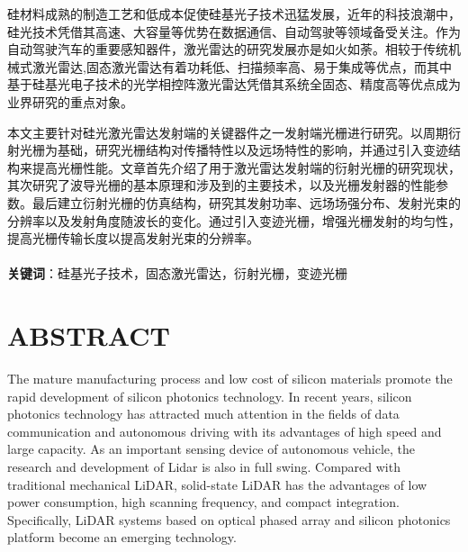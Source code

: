 \documentclass[UTF8,a4paper,12pt]{ctexart}
\numberwithin{equation}{section}
\begin{document}
\hspace{8mm}
硅材料成熟的制造工艺和低成本促使硅基光子技术迅猛发展，近年的科技浪潮中，硅光技术凭借其高速、大容量等优势在数据通信、自动驾驶等领域备受关注。作为自动驾驶汽车的重要感知器件，激光雷达的研究发展亦是如火如荼。相较于传统机械式激光雷达,固态激光雷达有着功耗低、扫描频率高、易于集成等优点，而其中基于硅基光电子技术的光学相控阵激光雷达凭借其系统全固态、精度高等优点成为业界研究的重点对象。
\par 
本文主要针对硅光激光雷达发射端的关键器件之一发射端光栅进行研究。以周期衍射光栅为基础，研究光栅结构对传播特性以及远场特性的影响，并通过引入变迹结构来提高光栅性能。文章首先介绍了用于激光雷达发射端的衍射光栅的研究现状，其次研究了波导光栅的基本原理和涉及到的主要技术，以及光栅发射器的性能参数。最后建立衍射光栅的仿真结构，研究其发射功率、远场场强分布、发射光束的分辨率以及发射角度随波长的变化。通过引入变迹光栅，增强光栅发射的均匀性，提高光栅传输长度以提高发射光束的分辨率。
\\
~\\
\textbf{关键词}：硅基光子技术，固态激光雷达，衍射光栅，变迹光栅\\

\newpage
{}
\section*{ABSTRACT}

\hspace{8mm}The mature manufacturing process and low cost of silicon materials promote the rapid development of silicon photonics technology. In recent years, silicon photonics technology has attracted much attention in the fields of data communication and autonomous driving with its advantages of high speed and large capacity. As an important sensing device of autonomous vehicle, the research and development of Lidar is also in full swing. Compared with traditional mechanical LiDAR, solid-state LiDAR has the advantages of low power consumption, high scanning frequency, and compact integration. Specifically, LiDAR systems based on optical phased array and silicon photonics platform become an emerging technology.\par
\end{document}
